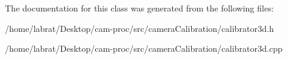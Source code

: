 The documentation for this class was generated from the following files\+:\begin{DoxyCompactItemize}
\item 
/home/labrat/\+Desktop/cam-\/proc/src/camera\+Calibration/calibrator3d.\+h\item 
/home/labrat/\+Desktop/cam-\/proc/src/camera\+Calibration/calibrator3d.\+cpp\end{DoxyCompactItemize}
